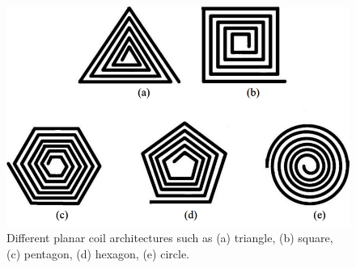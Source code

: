 \begin{figure}[th]
    \centering
    \includegraphics[scale=0.4]{Chapters/Chapter2/PCB_coils/Figures/coils_shapes.png}
    \caption[Coils Shapes]{Different planar coil architectures such as (a) triangle, (b) square, (c)
    pentagon, (d) hexagon, (e) circle.}
    \label{fig:Coils Shapes}
\end{figure}